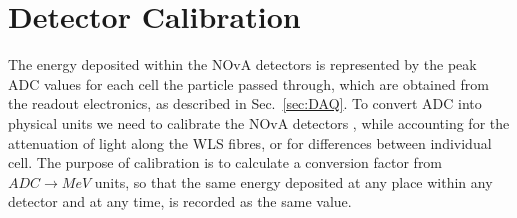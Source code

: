 

\section{Detector Calibration}\label{sec:NOvACalibration}
The energy deposited within the NOvA detectors is represented by the peak \gls{ADC} values for each cell the particle passed through, which are obtained from the readout electronics, as described in Sec.~\ref{sec:DAQ}.
To convert \gls{ADC} into physical units we need to calibrate the \gls{NOvA} detectors \cite{PrabhjotNOvAThesis_CalibrationAndOscResults2019.pdf}, while accounting for the attenuation of light along the \gls{WLS} fibres, or for differences between individual cell. The purpose of calibration is to calculate a conversion factor from $\unit{ADC}\rightarrow\unit{MeV}$ units, so that the same energy deposited at any place within any detector and at any time, is recorded as the same value.


